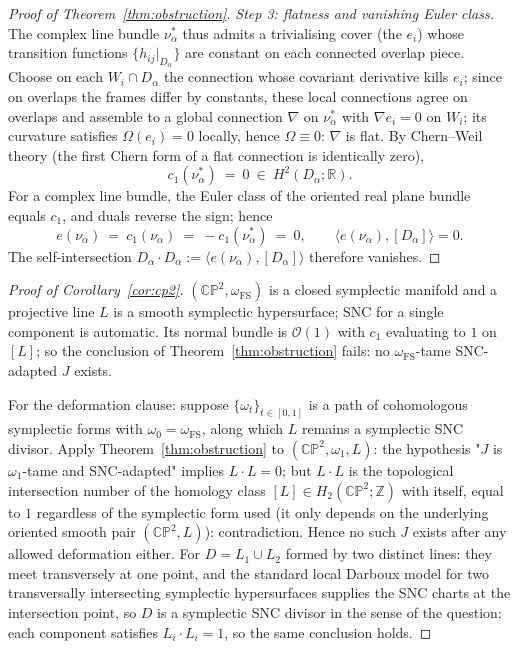 \documentclass[11pt]{article}
\theoremstyle{definition}
\theoremstyle{remark}
\newcommand{\RR}{\mathbb{R}}
\newcommand{\CP}{\mathbb{CP}}
\begin{document}
\begin{proof}[Proof of Theorem~\ref{thm:obstruction}]
\emph{Step 3: flatness and vanishing Euler class.}
The complex line bundle $\nu_\alpha^*$ thus admits a trivialising
cover (the $e_i$) whose transition functions
$\{h_{ij}|_{D_\alpha}\}$ are constant on each connected overlap
piece. Choose on each $W_i\cap D_\alpha$ the connection whose
covariant derivative kills $e_i$; since on overlaps the frames
differ by constants, these local connections agree on overlaps and
assemble to a global connection $\nabla$ on $\nu_\alpha^*$ with
$\nabla e_i=0$ on $W_i$; its curvature satisfies
$\Omega(e_i)=0$ locally, hence $\Omega\equiv0$: $\nabla$ is flat.
By Chern--Weil theory (the first Chern form of a flat
connection is identically zero),
\[
c_1(\nu_\alpha^*)\ =\ 0\ \in\ H^2(D_\alpha;\RR).
\]
For a complex line bundle, the Euler class of the oriented real
plane bundle equals $c_1$, and duals reverse the sign; hence
\[
e(\nu_\alpha)\ =\ c_1(\nu_\alpha)\ =\ -c_1(\nu_\alpha^*)\ =\ 0 ,
\qquad
\langle e(\nu_\alpha),[D_\alpha]\rangle=0 .
\]
The self-intersection $D_\alpha\cdot D_\alpha:=\langle
e(\nu_\alpha),[D_\alpha]\rangle$ therefore vanishes.
\end{proof}

\begin{proof}[Proof of Corollary~\ref{cor:cp2}]
$(\CP^2,\omega_{\mathrm{FS}})$ is a closed symplectic manifold and
a projective line $L$ is a smooth symplectic hypersurface; SNC for a
single component is automatic. Its normal bundle is
$\mathcal O(1)$ with $c_1$ evaluating to $1$ on $[L]$; so the
conclusion of Theorem~\ref{thm:obstruction} fails: no
$\omega_{\mathrm{FS}}$-tame SNC-adapted $J$ exists.

For the deformation clause: suppose $\{\omega_t\}_{t\in[0,1]}$ is a
path of cohomologous symplectic forms with $\omega_0=
\omega_{\mathrm{FS}}$, along which $L$ remains a symplectic SNC
divisor. Apply Theorem~\ref{thm:obstruction} to
$(\CP^2,\omega_1,L)$: the hypothesis "$J$ is $\omega_1$-tame and
SNC-adapted" implies $L\cdot L=0$; but $L\cdot L$ is the
topological intersection number of the homology class
$[L]\in H_2(\CP^2;\mathbb Z)$ with itself, equal to $1$ regardless
of the symplectic form used (it only depends on the underlying
oriented smooth pair $(\CP^2,L)$): contradiction. Hence no such $J$
exists after any allowed deformation either. For
$D=L_1\cup L_2$ formed by two distinct lines: they meet transversely
at one point, and the standard local Darboux model for two
transversally intersecting symplectic hypersurfaces supplies the SNC
charts at the intersection point, so $D$ is a symplectic SNC divisor
in the sense of the question; each component satisfies
$L_i\cdot L_i=1$, so the same conclusion holds.
\end{proof}
\end{document}

